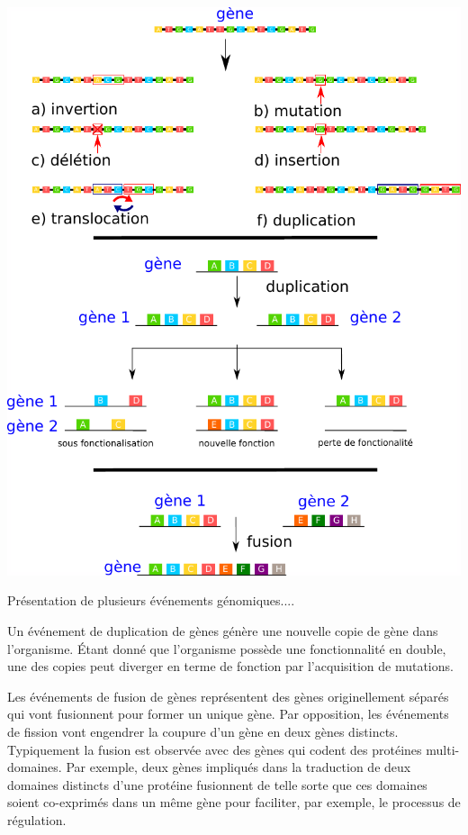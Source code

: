 \begin{refsegment}
    \begin{shadedfigure}[H]
        \centering
        \includegraphics[width=\textwidth]{img/gene_indel.pdf}
        \caption{Présentation de plusieurs événements génomiques....}
        \label{fig:/evenement_mutation}
    \end{shadedfigure}
    
    
    Un événement de duplication de gènes génère une nouvelle copie de gène dans l'organisme. Étant donné que l'organisme possède une fonctionnalité en double, une des copies peut diverger en terme de fonction par l'acquisition de mutations. 
    
    Les événements de fusion de gènes représentent des gènes originellement séparés qui vont fusionnent pour former un unique gène. Par opposition, les événements de fission vont  engendrer la coupure d'un gène en deux gènes distincts. Typiquement la fusion est observée avec des gènes qui codent des protéines multi-domaines. Par exemple, deux gènes impliqués dans la traduction de deux domaines distincts d'une protéine fusionnent de telle sorte que ces domaines soient co-exprimés dans un même gène pour faciliter, par exemple, le processus de régulation.
    

\end{refsegment}
